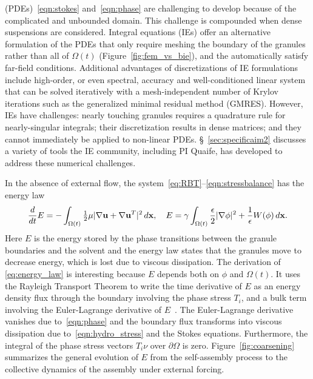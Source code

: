 (PDEs)~\eqref{eqn:stokes}
and~\eqref{eqn:phase} are challenging to develop because of
the complicated and unbounded domain.
This challenge is compounded when dense
suspensions are considered. Integral equations (IEs) offer an
alternative formulation of the PDEs that only require meshing the
boundary of the granules rather than all of $\Omega(t)$
(Figure~\ref{fig:fem_vs_bie}), and the automatically satisfy far-field
conditions. Additional advantages of discretizations of IE
formulations include high-order, or even spectral, accuracy and
well-conditioned linear system that can be solved iteratively with a
mesh-independent number of Krylov iterations such as the generalized
minimal residual method (GMRES). However, IEs have challenges: nearly
touching granules requires a quadrature rule for nearly-singular
integrals; their discretization results in dense matrices; and they
cannot immediately be applied to non-linear PDEs.
\S~\ref{sec:specificaim2} discusses
a variety of tools the IE community,
including PI Quaife, has developed
to address these numerical challenges.

In the absence of external flow, the
system~\eqref{eq:RBT}--\eqref{eqn:stressbalance} has the energy law
\begin{align}
\label{eq:energy_law}
  \frac{d}{dt}E
  = - \int_{\Omega(t)}\tfrac{1}{2}\mu|\nabla \mathbf{u} + \nabla
  \mathbf{u}^T|^2 \,d\mathbf{x},\quad
    E = \gamma \int_{\Omega(t)}
  \frac{\epsilon}{2} |\nabla \phi|^2 + \frac{1}{\epsilon} W(\phi) \,d\mathbf{x}.
\end{align}
Here $E$ is the energy stored by the phase transitions
between the granule boundaries and the solvent and the energy law states that
the granules move to decrease energy,
which is lost due to viscous dissipation.
The derivation of \eqref{eq:energy_law} is interesting
because $E$ depends both on $\phi$
and $\Omega(t)$. It uses the Rayleigh Transport Theorem to write the time
derivative of $E$ as an energy density flux through the boundary
involving the phase stress $T_i$, and a bulk term involving the Euler-Lagrange
derivative of $E$~\cite{Fu2018_SIAM}. The Euler-Lagrange derivative vanishes due
to~\eqref{eqn:phase} and the boundary flux transforms into viscous
dissipation due to~\eqref{eqn:hydro_stress} and the Stokes equations.
Furthermore, the integral of the 
phase stress vectors $T_i\nu$ over $\partial \Omega$ is zero.
Figure~\ref{fig:coarsening} summarizes the general evolution of $E$ from the
self-assembly process to
the collective dynamics of the assembly under external forcing.


